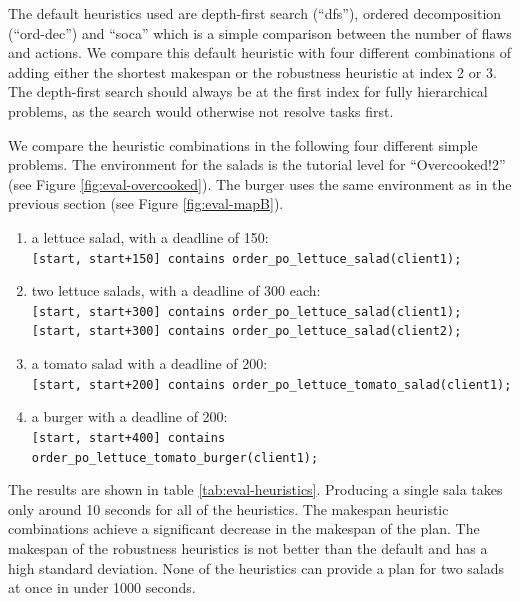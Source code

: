 The default heuristics used are depth-first search (``dfs''), ordered decomposition (``ord-dec'') and ``soca'' which is a simple comparison between the number of flaws and actions.
We compare this default heuristic with four different combinations of adding either the shortest makespan or the robustness heuristic at index 2 or 3.
The depth-first search should always be at the first index for fully hierarchical problems, as the search would otherwise not resolve tasks first.


We compare the heuristic combinations in the following four different simple problems.
The environment for the salads is the tutorial level for ``Overcooked!2'' (see Figure \ref{fig:eval-overcooked}).
The burger uses the same environment as in the previous section (see Figure \ref{fig:eval-mapB}).
\begin{enumerate}
  \item a lettuce salad, with a deadline of 150:\\ 
    \verb|[start, start+150] contains order_po_lettuce_salad(client1);|
  \item two lettuce salads, with a deadline of 300 each:\\
    \verb|[start, start+300] contains order_po_lettuce_salad(client1);|\\
    \verb|[start, start+300] contains order_po_lettuce_salad(client2);|\\
  \item a tomato salad with a deadline of 200:\\
    \verb|[start, start+200] contains order_po_lettuce_tomato_salad(client1);|
  \item a burger with a deadline of 200:\\
    \verb|[start, start+400] contains order_po_lettuce_tomato_burger(client1);|
\end{enumerate}

The results are shown in table \ref{tab:eval-heuristics}.
Producing a single sala takes only around 10 seconds for all of the heuristics.
The makespan heuristic combinations achieve a significant decrease in the makespan of the plan.
The makespan of the robustness heuristics is not better than the default and has a high standard deviation.
None of the heuristics can provide a plan for two salads at once in under 1000 seconds.





